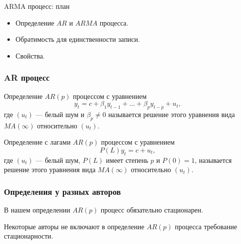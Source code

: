 
\begin{frame} %


\end{frame}



\begin{frame}{ARMA процесс: план}
  \begin{itemize}[<+->]
    \item Определение $AR$ и $ARMA$ процесса. 
    \item Обратимость для единственности записи. 
    \item Свойства.
  \end{itemize}

\end{frame}

\begin{frame}
  \frametitle{AR процесс}

  \begin{block}{Определение}
    $AR(p)$ процессом с уравнением 
    \[
      y_t = c + \beta_1 y_{t-1} + \ldots + \beta_p y_{t-p} + u_t, 
    \]
    где $(u_t)$ — белый шум и $\beta_p \neq 0$ называется 
    решение этого уравнения вида $MA(\infty)$ относительно $(u_t)$.
  \end{block}

  \pause  
  \begin{block}{Определение с лагами}
    $AR(p)$ процессом с уравнением 
    \[
      P(L)y_t = c + u_t, 
    \]
    где $(u_t)$ — белый шум, $P(L)$ имеет степень $p$ и $P(0)=1$, называется 
    решение этого уравнения вида $MA(\infty)$ относительно $(u_t)$.  
  \end{block}

\end{frame}

\begin{frame}
  \frametitle{Определения у разных авторов}

  \pause 
  В нашем определении $AR(p)$ процесс обязательно \alert{стационарен}. 
  
  \pause
  Некоторые авторы \alert{не включают} в определение $AR(p)$ процесса требование стационарности. 

\end{frame}

